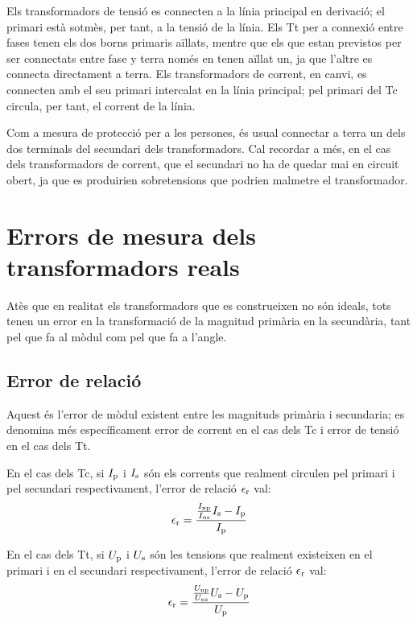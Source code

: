 Els transformadors de tensió es connecten a la línia principal en
derivació; el  primari està sotmès, per tant, a la tensió de la
línia. Els Tt per a connexió entre fases tenen els dos borns
primaris aïllats, mentre que els que estan previstos per ser
connectats entre fase y terra només en tenen aïllat un, ja que
l'altre es connecta directament a terra. Els transformadors de
corrent, en canvi, es connecten amb el seu primari intercalat en la
línia principal;  pel primari del Tc circula, per tant, el corrent
 de la línia.

 Com a mesura de protecció per a les persones, és usual
connectar a terra un dels dos terminals del secundari dels
transformadors. Cal recordar a més, en el cas dels transformadors de
corrent, que el secundari no ha de quedar mai en circuit obert, ja
que es produirien sobretensions que podrien malmetre el
transformador.

\section{Errors de mesura dels transformadors reals}

Atès que en realitat els transformadors que es construeixen no són
ideals, tots tenen un error en la transformació de la magnitud
primària en la secundària, tant pel que fa al mòdul com pel que fa
a l'angle.

\subsection{Error de relació}

Aquest és l'error de mòdul existent entre les magnituds primària i
secundaria; es denomina més específicament error de corrent en el
cas dels Tc i error de tensió en el cas dels Tt.

En el cas dels Tc, si $I_\mathrm{p}$ i $I_\mathrm{s}$ són els corrents que
realment circulen pel primari i pel secundari respectivament,
l'error de relació $\epsilon_\mathrm{r}$ val:
\begin{equation}
    \epsilon_\mathrm{r} = \frac{\frac{I_\mathrm{np}}{I_\mathrm{ns}} I_\mathrm{s} - I_\mathrm{p}} {I_\mathrm{p}}
\end{equation}

En el cas dels Tt, si $U_\mathrm{p}$ i $U_\mathrm{s}$ són les tensions que
realment existeixen en el primari i en el secundari respectivament,
l'error de relació $\epsilon_\mathrm{r}$ val:
\begin{equation}
    \epsilon_\mathrm{r} = \frac{\frac{U_\mathrm{np}}{U_\mathrm{ns}} U_\mathrm{s} - U_\mathrm{p}} {U_\mathrm{p}}
\end{equation}

